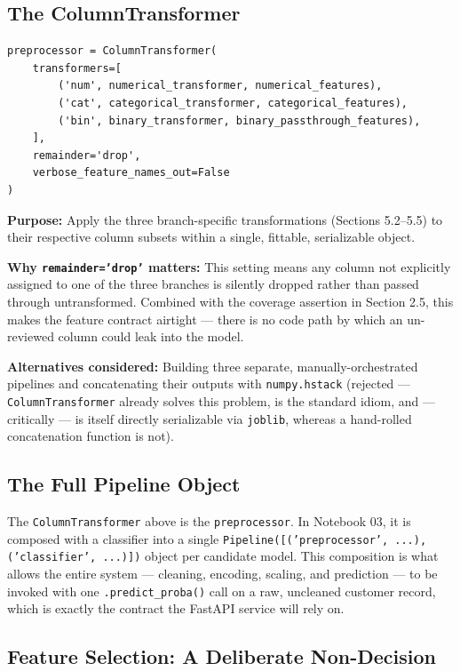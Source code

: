 \documentclass[11pt]{article}
\newcommand{\artifact}[1]{\texttt{\color{navy}#1}}
\begin{document}
\subsection{The ColumnTransformer}
\label{sec:columntransformer}

\begin{lstlisting}
preprocessor = ColumnTransformer(
    transformers=[
        ('num', numerical_transformer, numerical_features),
        ('cat', categorical_transformer, categorical_features),
        ('bin', binary_transformer, binary_passthrough_features),
    ],
    remainder='drop',
    verbose_feature_names_out=False
)
\end{lstlisting}

\textbf{Purpose:} Apply the three branch-specific transformations (Sections 5.2--5.5) to their respective column subsets within a single, fittable, serializable object.

\textbf{Why \texttt{remainder='drop'} matters:} This setting means any column not explicitly assigned to one of the three branches is silently dropped rather than passed through untransformed. Combined with the coverage assertion in Section 2.5, this makes the feature contract airtight --- there is no code path by which an un-reviewed column could leak into the model.

\textbf{Alternatives considered:} Building three separate, manually-orchestrated pipelines and concatenating their outputs with \texttt{numpy.hstack} (rejected --- \texttt{ColumnTransformer} already solves this problem, is the standard idiom, and --- critically --- is itself directly serializable via \texttt{joblib}, whereas a hand-rolled concatenation function is not).

\subsection{The Full Pipeline Object}

The \texttt{ColumnTransformer} above is the \artifact{preprocessor}. In Notebook 03, it is composed with a classifier into a single \texttt{Pipeline([('preprocessor', ...), ('classifier', ...)])} object per candidate model. This composition is what allows the entire system --- cleaning, encoding, scaling, and prediction --- to be invoked with one \texttt{.predict\_proba()} call on a raw, uncleaned customer record, which is exactly the contract the FastAPI service will rely on.

\subsection{Feature Selection: A Deliberate Non-Decision}
\end{document}
